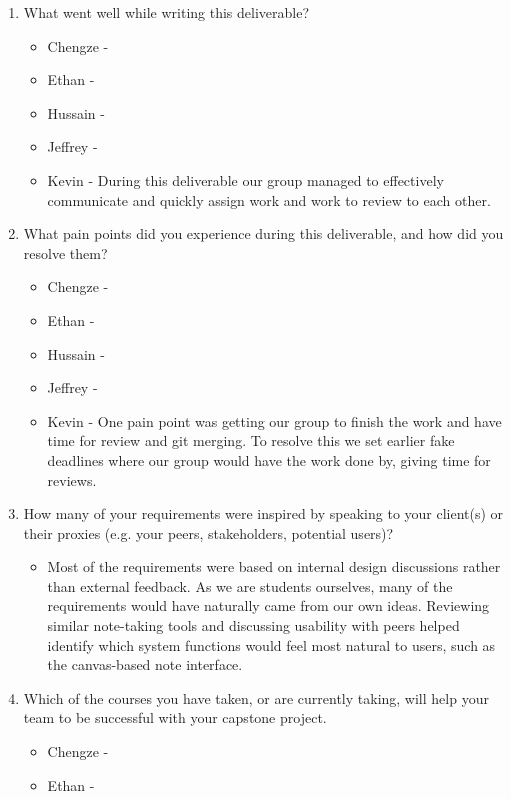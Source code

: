 \begin{enumerate}
  \item What went well while writing this deliverable?
  \begin{itemize}
        \item Chengze - 
        \item Ethan - 
        \item Hussain - 
        \item Jeffrey - 
        \item Kevin - During this deliverable our group managed to effectively communicate and quickly assign work and work to review to each other. 
  \end{itemize} 
  \item What pain points did you experience during this deliverable, and how did
  you resolve them?
  \begin{itemize}
        \item Chengze - 
        \item Ethan - 
        \item Hussain - 
        \item Jeffrey - 
        \item Kevin - One pain point was getting our group to finish the work and have time for review and git merging. To resolve this we set earlier fake deadlines where our group would have the work done by, giving time for reviews. 
  \end{itemize} 
  \item How many of your requirements were inspired by speaking to your
  client(s) or their proxies (e.g. your peers, stakeholders, potential users)?
  \begin{itemize}
        \item Most of the requirements were based on internal design discussions 
        rather than external feedback. As we are students ourselves, many of the 
        requirements would have naturally came from our own ideas. Reviewing 
        similar note-taking tools and discussing usability with peers helped 
        identify which system functions would feel most natural to users, such 
        as the canvas-based note interface.
  \end{itemize} 
  \item Which of the courses you have taken, or are currently taking, will help
  your team to be successful with your capstone project.
  \begin{itemize}
        \item Chengze - 
        \item Ethan - 

\end{itemize}
\end{enumerate}

